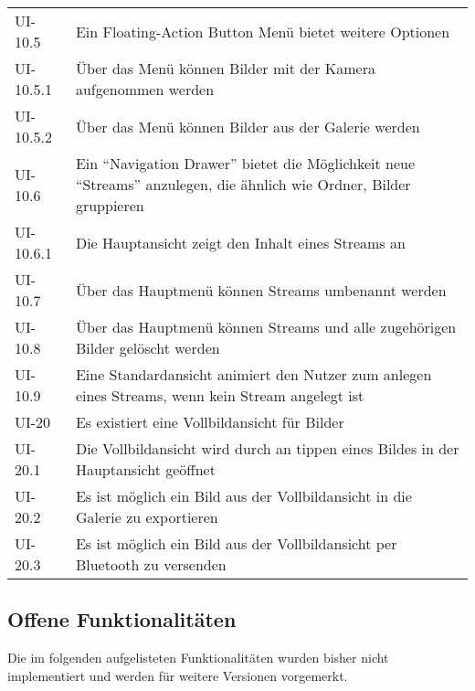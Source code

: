 \begin{center}
\begin{longtable}{|l|p{12cm}|}
UI-10.5 &  Ein Floating-Action Button Menü bietet weitere Optionen\\
UI-10.5.1 &  Über das Menü können Bilder mit der Kamera aufgenommen werden\\
UI-10.5.2 &  Über das Menü können Bilder aus der Galerie werden\\
UI-10.6 & Ein \enquote{Navigation Drawer} bietet die Möglichkeit neue \enquote{Streams} anzulegen, die ähnlich wie Ordner, Bilder gruppieren\\
UI-10.6.1 & Die Hauptansicht zeigt den Inhalt eines Streams an\\
UI-10.7 & Über das Hauptmenü können Streams umbenannt werden\\
UI-10.8 & Über das Hauptmenü können Streams und alle zugehörigen Bilder gelöscht werden\\
UI-10.9 & Eine Standardansicht animiert den Nutzer zum anlegen eines Streams, wenn kein Stream angelegt ist\\
\hline
UI-20 &  Es existiert eine Vollbildansicht für Bilder\\
UI-20.1 & Die Vollbildansicht wird durch an tippen eines Bildes in der Hauptansicht geöffnet\\
UI-20.2 & Es ist möglich ein Bild aus der Vollbildansicht in die Galerie zu exportieren\\
UI-20.3 & Es ist möglich ein Bild aus der Vollbildansicht per Bluetooth zu versenden\\
\hline
\end{longtable}
\end{center}

\subsection{Offene Funktionalitäten}

Die im folgenden aufgelisteten Funktionalitäten wurden bisher nicht implementiert und werden für weitere Versionen vorgemerkt.

